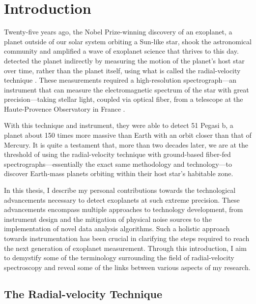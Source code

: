 \chapter{Introduction} \label{intro}

Twenty-five years ago, the Nobel Prize-winning discovery of an exoplanet, a planet outside of our solar system orbiting a Sun-like star, shook the astronomical community and amplified a wave of exoplanet science that thrives to this day. \citet{mayor_jupiter-mass_1995} detected the planet indirectly by measuring the motion of the planet's host star over time, rather than the planet itself, using what is called the radial-velocity technique \citep{lovis_radial_2011}. These measurements required a high-resolution spectrograph---an instrument that can measure the electromagnetic spectrum of the star with great precision---taking stellar light, coupled via optical fiber, from a telescope at the Haute-Provence Observatory in France \citep{baranne_elodie_1996}.

With this technique and instrument, they were able to detect 51 Pegasi b, a planet about 150 times more massive than Earth with an orbit closer than that of Mercury. It is quite a testament that, more than two decades later, we are at the threshold of using the radial-velocity technique with ground-based fiber-fed spectrographs---essentially the exact same methodology and technology---to discover Earth-mass planets orbiting within their host star's habitable zone.

In this thesis, I describe my personal contributions towards the technological advancements necessary to detect exoplanets at such extreme precision. These advancements encompass multiple approaches to technology development, from instrument design and the mitigation of physical noise sources to the implementation of novel data analysis algorithms. Such a holistic approach towards instrumentation has been crucial in clarifying the steps required to reach the next generation of exoplanet measurement. Through this introduction, I aim to demystify some of the terminology surrounding the field of radial-velocity spectroscopy and reveal some of the links between various aspects of my research.

\section{The Radial-velocity Technique} \label{intro:eprv}

